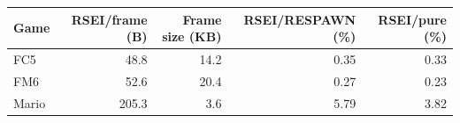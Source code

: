 \begin{tabular}{@{}lrrrr@{}}
\toprule
\textbf{Game} & \textbf{RSEI/frame (B)} & \textbf{Frame size (KB)} & \textbf{RSEI/RESPAWN (\%)} & \textbf{RSEI/pure (\%)} \\
\midrule
FC5 & 48.8 & 14.2 & 0.35 & 0.33 \\
FM6 & 52.6 & 20.4 & 0.27 & 0.23 \\
Mario & 205.3 & 3.6 & 5.79 & 3.82 \\
\bottomrule
\end{tabular}
